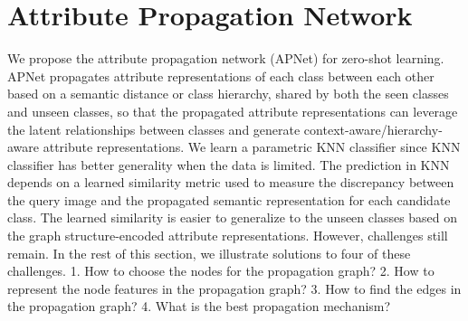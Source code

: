 \documentclass[letterpaper]{article} %
\def\vx{{\bm{x}}}
\begin{document}


\section{Attribute Propagation Network}
\label{model}

We propose the attribute propagation network (APNet) for zero-shot learning. APNet propagates attribute representations of each class between each other based on a semantic distance or class hierarchy, shared by both the seen classes and unseen classes, so that the propagated attribute representations can leverage the latent relationships between classes and generate context-aware/hierarchy-aware attribute representations. We learn a parametric KNN classifier since KNN classifier has better generality when the data is limited.
The prediction in KNN depends on a learned similarity metric used to measure the discrepancy between the query image and the propagated semantic representation for each candidate class. 
The learned similarity is easier to generalize to the unseen classes based on the graph structure-encoded attribute representations.
However, challenges still remain. In the rest of this section, we illustrate solutions to four of these challenges. 
1. How to choose the nodes for the propagation graph? 
2. How to represent the node features in the propagation graph? 
3. How to find the edges in the propagation graph? 
4. What is the best propagation mechanism?


\end{document}
